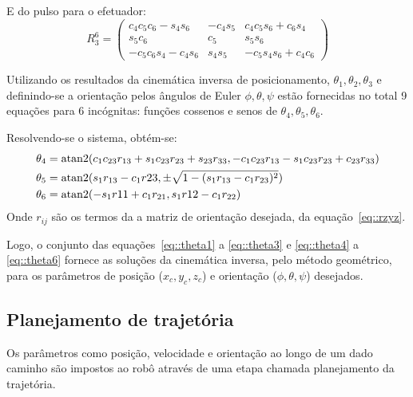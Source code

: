 E do pulso para o efetuador:
%
\begin{equation}
R_3^6 = 
\begin{pmatrix}
{ c_4} { c_5} { c_6}-{ s_4} {
 s_6}&-{ c_4} { s_5}&{ c_4} { c_5} { s_6}+{ c_6} {
 s_4}\\ { s_5} { c_6}&{ c_5}&{ s_5} {
 s_6}\\ -{ c_5} { c_6} { s_4}-{ c_4} {
 s_6}&{ s_4} { s_5}&-{ c_5} { s_4} { s_6}+{ c_4} {
 c_6}
\end{pmatrix} 
\end{equation}
%

Utilizando os resultados da cinemática inversa de posicionamento,
$\theta_1, \theta_2, \theta_3$ e definindo-se a orientação pelos ângulos de
Euler $\phi, \theta, \psi$ estão fornecidas no total 9 equações para 6
incógnitas: funções cossenos e senos de $\theta_4, \theta_5, \theta_6$.

Resolvendo-se o sistema, obtém-se:
%
\begin{align}
	\theta_4 &= \operatorname{atan2}(c_1 c_{23} r_{13} + s_1 c_{23} r_{23} + s_{23} r_{33},
	-c_1 c_{23} r_{13} - s_1 c_{23} r_{23} + c_{23} r_{33} ) \label{eq::theta4} \\
	\theta_5 &= \operatorname{atan2}(s_1 r_{13} - c_1 r{23}, \pm \sqrt{1- (s_1 r_{13} - c_1
	r_{23})^2}) \label{eq::theta5} \\
	\theta_6 &= \operatorname{atan2}(-s_1 r{11} + c_1 r_{21}, s_1 r{12} - c_1 r_{22})
	\label{eq::theta6}
\end{align}
%
Onde $r_{ij}$ são os termos da a matriz de orientação desejada, da
equação~\ref{eq::rzyz}.

Logo, o conjunto das equações~\ref{eq::theta1} a \ref{eq::theta3} e
\ref{eq::theta4} a \ref{eq::theta6} fornece as soluções da cinemática inversa,
pelo método geométrico, para os parâmetros de posição ($x_c, y_c, z_c$) e
orientação ($\phi, \theta, \psi$) desejados. 


\subsection{ Planejamento de trajetória} \label{sec::plan_traj}

Os parâmetros como posição, velocidade e orientação ao longo de um dado caminho
são impostos ao robô através de uma etapa chamada planejamento da trajetória.



